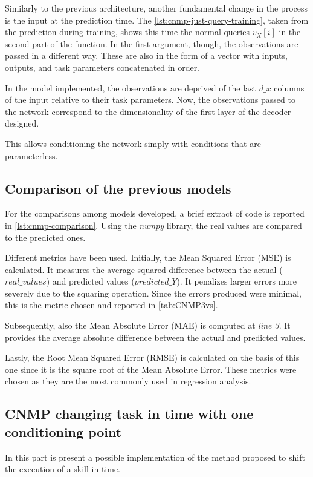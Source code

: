 Similarly to the previous architecture, another fundamental change in the process is the input at the prediction time. The \cref{lst:cnmp-just-query-training}, taken from the prediction during training, shows this time the normal queries $v_X [ i ]$ in the second part of the function. In the first argument, though, the observations are passed in a different way. These are also in the form of a vector with inputs, outputs, and task parameters concatenated in order. 

In the model implemented, the observations are deprived of the last $d\_x$ columns of the input relative to their task parameters. Now, the observations passed to the network correspond to the dimensionality of the first layer of the decoder designed.

This allows conditioning the network simply with conditions that are parameterless. 


\subsection{Comparison of the previous models}

For the comparisons among models developed, a brief extract of code is reported in \cref{lst:cnmp-comparison}. Using the \emph{numpy} library, the real values are compared to the predicted ones. 

Different metrics have been used. Initially, the Mean Squared Error (MSE) is calculated. It measures the average squared difference between the actual ($real\_values$) and predicted values ($predicted\_Y$). It penalizes larger errors more severely due to the squaring operation. Since the errors produced were minimal, this is the metric chosen and reported in \cref{tab:CNMP3vs}.

Subsequently, also the Mean Absolute Error (MAE) is computed at \emph{line 3}. It provides the average absolute difference between the actual and predicted values.

Lastly, the Root Mean Squared Error (RMSE) is calculated on the basis of this one since it is the square root of the Mean Absolute Error. These metrics were chosen as they are the most commonly used in regression analysis.




\subsection{CNMP changing task in time with one conditioning point}
In this part is present a possible implementation of the method proposed to shift the execution of a skill in time.


